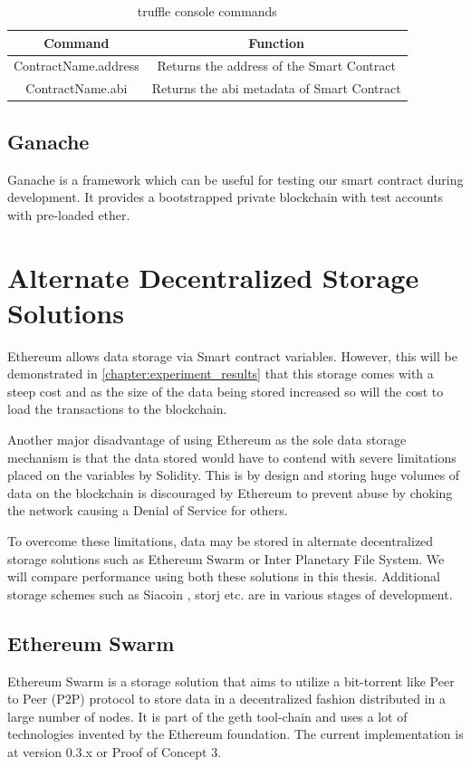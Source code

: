 \documentclass[11pt,openright]{report}
\begin{document}
\begin{table}[!htbp]
    \renewcommand{\arraystretch}{1.3}
    \caption{truffle console commands}
    \label{truffle_console}
    \centering
    \begin{tabular}{|c|c|}
        \hline
        \bfseries Command & \bfseries Function \\
        \hline\hline
        ContractName.address & Returns the address of the Smart Contract \\ \hline
        ContractName.abi & Returns the abi metadata of Smart Contract \\ \hline

    \end{tabular}
\end{table}

\subsection{Ganache}
Ganache is a framework which can be useful for testing our smart contract during development. It provides a bootstrapped private blockchain with test accounts with pre-loaded ether.

\section{Alternate Decentralized Storage Solutions}
Ethereum allows data storage via Smart contract variables. However, this will be demonstrated in \ref{chapter:experiment_results} that this storage comes with a steep cost and as the size of the data being stored increased so will the cost to load the transactions to the blockchain.

Another major disadvantage of using Ethereum as the sole data storage mechanism is that the data stored would have to contend with severe limitations placed on the variables by Solidity. This is by design and storing huge volumes of data on the blockchain is discouraged by Ethereum to prevent abuse by choking the network causing a Denial of Service for others.

To overcome these limitations, data may be stored in alternate decentralized storage solutions such as Ethereum Swarm or Inter Planetary File System. We will compare performance using both these solutions in this thesis. Additional storage schemes such as Siacoin \cite{vorick2014sia}, storj \cite{wilkinsonetal2014storj} etc. are in various stages of development.

\subsection{Ethereum Swarm}
Ethereum Swarm \cite{swarm} is a storage solution that aims to utilize a bit-torrent like Peer to Peer (P2P) protocol to store data in a decentralized fashion distributed in a large number of nodes. It is part of the geth tool-chain and uses a lot of technologies invented by the Ethereum foundation. The current implementation is at version 0.3.x or Proof of Concept 3. 
\end{document}
